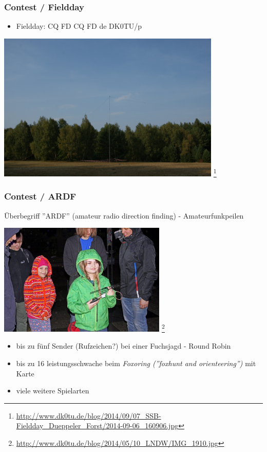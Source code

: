 \begin{frame}
    \frametitle{Contest / Fieldday}

    \begin{itemize}
        \item Fieldday: CQ FD CQ FD de DK0TU/p
    \end{itemize}

    \begin{center}
        \includegraphics[width=0.8\textwidth]{bv10/2014-09-06_160906.jpg}
        \footnote{\tiny \url{http://www.dk0tu.de/blog/2014/09/07_SSB-Fieldday_Dueppeler_Forst/2014-09-06_160906.jpg}}
    \end{center}

\end{frame}

\begin{frame}
    \frametitle{Contest / ARDF}

    Überbegriff ''ARDF'' (amateur radio direction finding) - Amateurfunkpeilen

    \begin{center}
        \includegraphics[width=0.6\textwidth]{bv10/IMG_1910.jpg}
        \footnote{\tiny \url{http://www.dk0tu.de/blog/2014/05/10_LNDW/IMG_1910.jpg}}
    \end{center}

    \begin{itemize}
        \item bis zu fünf Sender (Rufzeichen?) bei einer Fuchsjagd - Round Robin
        \item bis zu 16 leistungsschwache beim \emph{Foxoring (''foxhunt and
              orienteering'')} mit Karte
        \item viele weitere Spielarten
    \end{itemize}

\end{frame}

